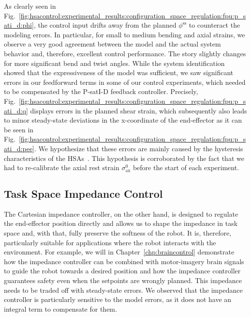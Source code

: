 As clearly seen in Fig.~\ref{fig:hsacontrol:experimental_results:configuration_space_regulation:fpu:p_sati_d:phi}, the control input drifts away from the planned $\phi^\mathrm{ss}$ to counteract the modeling errors.
In particular, for small to medium bending and axial strains, we observe a very good agreement between the model and the actual system behavior and, therefore, excellent control performance. 
The story slightly changes for more significant bend and twist angles. While the system identification showed that the expressiveness of the model was sufficient, we saw significant errors in our feedforward terms in some of our control experiments, which needed to be compensated by the P-satI-D feedback controller. Precisely, Fig.~\ref{fig:hsacontrol:experimental_results:configuration_space_regulation:fpu:p_sati_d:q} displays errors in the planned shear strain, which subsequently also leads to minor steady-state deviations in the x-coordinate of the end-effector as it can be seen in Fig.~\ref{fig:hsacontrol:experimental_results:configuration_space_regulation:fpu:p_sati_d:pee}. We hypothesize that these errors are mainly caused by the hysteresis characteristics of the \glspl{HSA}~\citep{good2022expanding}. This hypothesis is corroborated by the fact that we had to re-calibrate the axial rest strain $\sigma_\mathrm{ax}^0$ before the start of each experiment.

\subsection{Task Space Impedance Control}
The Cartesian impedance controller, on the other hand, is designed to regulate the end-effector position directly and allows us to shape the impedance in task space and, with that, fully preserve the softness of the robot.
It is, therefore, particularly suitable for applications where the robot interacts with the environment. For example, we will in Chapter~\ref{chp:braincontrol} demonstrate how the impedance controller can be combined with motor-imagery brain signals to guide the robot towards a desired position and how the impedance controller guarantees safety even when the setpoints are wrongly planned.
This impedance needs to be traded off with steady-state errors. We observed that the impedance controller is particularly sensitive to the model errors, as it does not have an integral term to compensate for them.
